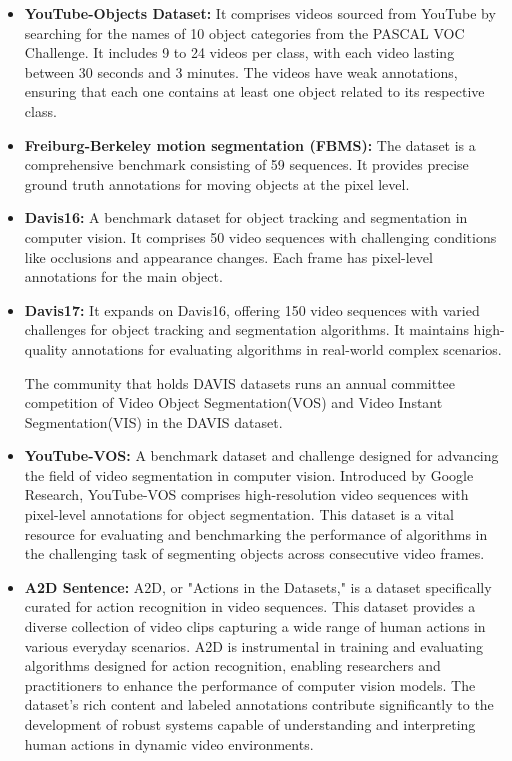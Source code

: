 \begin{itemize}
\item \textbf{YouTube-Objects Dataset:} It comprises videos sourced from YouTube by searching for the names of 10 object categories from the PASCAL VOC Challenge. It includes 9 to 24 videos per class, with each video lasting between 30 seconds and 3 minutes. The videos have weak annotations, ensuring that each one contains at least one object related to its respective class.

\item \textbf{Freiburg-Berkeley motion segmentation (FBMS):} The dataset is a comprehensive benchmark consisting of 59 sequences. It provides precise ground truth annotations for moving objects at the pixel level.

\item \textbf{Davis16:} A benchmark dataset for object tracking and segmentation in computer vision. It comprises 50 video sequences with challenging conditions like occlusions and appearance changes. Each frame has pixel-level annotations for the main object.

\clearpage

\item \textbf{Davis17:} It expands on Davis16, offering 150 video sequences with varied challenges for object tracking and segmentation algorithms. It maintains high-quality annotations for evaluating algorithms in real-world complex scenarios.

\noindent
The community that holds DAVIS datasets runs an annual committee competition of Video Object Segmentation(VOS) and Video Instant Segmentation(VIS) in the DAVIS dataset.


\item \textbf{YouTube-VOS:} A benchmark dataset and challenge designed for advancing the field of video segmentation in computer vision. Introduced by Google Research, YouTube-VOS comprises high-resolution video sequences with pixel-level annotations for object segmentation. This dataset is a vital resource for evaluating and benchmarking the performance of algorithms in the challenging task of segmenting objects across consecutive video frames. 


\item \textbf{A2D Sentence:} A2D, or "Actions in the Datasets," is a dataset specifically curated for action recognition in video sequences. This dataset provides a diverse collection of video clips capturing a wide range of human actions in various everyday scenarios. A2D is instrumental in training and evaluating algorithms designed for action recognition, enabling researchers and practitioners to enhance the performance of computer vision models. The dataset's rich content and labeled annotations contribute significantly to the development of robust systems capable of understanding and interpreting human actions in dynamic video environments.


\end{itemize}
